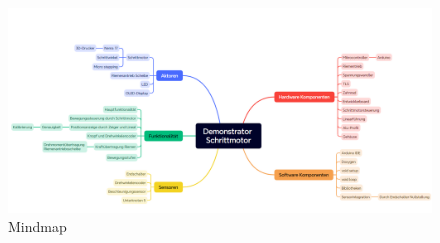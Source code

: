 \begin{figure}[H]
	\begin{center}
		\includegraphics[width=\textwidth]{../Appendix/Mindmap/Mindmap.png}
		\caption{Mindmap} \label{Mindmap}
	\end{center}
\end{figure} 

